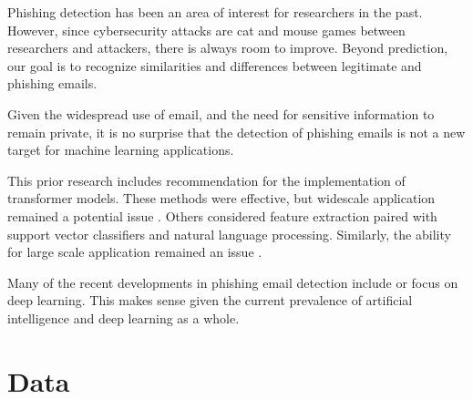 \documentclass[article,pdftex,10pt,a4paper,twocolumn]{article}
\begin{document}
Phishing detection has been an area of interest for researchers in the past. However, since cybersecurity attacks are cat and mouse games between researchers and attackers, there is always room to improve. Beyond prediction, our goal is to recognize similarities and differences between legitimate and phishing emails.

Given the widespread use of email, and the need for sensitive information to remain private, it is no surprise that the detection of phishing emails is not a new target for machine learning applications.

This prior research includes recommendation for the implementation of transformer models. These methods were effective, but widescale application remained a potential issue \citep{alhuzali}. Others considered feature extraction paired with support vector classifiers and natural language processing. Similarly, the ability for large scale application remained an issue \citep{alkhodhairy}.

Many of the recent developments in phishing email detection include or focus on deep learning. This makes sense given the current prevalence of artificial intelligence and deep learning as a whole.

\section{Data}
\label{data}


\end{document}
